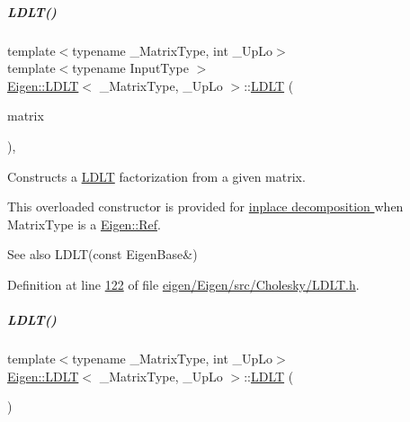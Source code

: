 \mbox{\label{group___cholesky___module_adf853d6cbbc49f3535a44439bca344d9}} 
\subparagraph{\texorpdfstring{L\+D\+L\+T()}{LDLT()}\hspace{0.1cm}{\footnotesize\ttfamily [4/8]}}
{\footnotesize\ttfamily template$<$typename \+\_\+\+Matrix\+Type, int \+\_\+\+Up\+Lo$>$ \\
template$<$typename Input\+Type $>$ \\
\hyperlink{group___cholesky___module_class_eigen_1_1_l_d_l_t}{Eigen\+::\+L\+D\+LT}$<$ \+\_\+\+Matrix\+Type, \+\_\+\+Up\+Lo $>$\+::\hyperlink{group___cholesky___module_class_eigen_1_1_l_d_l_t}{L\+D\+LT} (\begin{DoxyParamCaption}\item[{\hyperlink{group___core___module_struct_eigen_1_1_eigen_base}{Eigen\+Base}$<$ Input\+Type $>$ \&}]{matrix }\end{DoxyParamCaption})\hspace{0.3cm}{\ttfamily [inline]}, {\ttfamily [explicit]}}



Constructs a \hyperlink{group___cholesky___module_class_eigen_1_1_l_d_l_t}{L\+D\+LT} factorization from a given matrix. 

This overloaded constructor is provided for \hyperlink{group___inplace_decomposition}{inplace decomposition } when {\ttfamily Matrix\+Type} is a \hyperlink{group___core___module_class_eigen_1_1_ref}{Eigen\+::\+Ref}.

\begin{DoxySeeAlso}{See also}
L\+D\+L\+T(const Eigen\+Base\&) 
\end{DoxySeeAlso}


Definition at line \hyperlink{eigen_2_eigen_2src_2_cholesky_2_l_d_l_t_8h_source_l00122}{122} of file \hyperlink{eigen_2_eigen_2src_2_cholesky_2_l_d_l_t_8h_source}{eigen/\+Eigen/src/\+Cholesky/\+L\+D\+L\+T.\+h}.

\mbox{\label{group___cholesky___module_a2e06dedd2651649c5b251fbf9ba4e7d4}} 
\subparagraph{\texorpdfstring{L\+D\+L\+T()}{LDLT()}\hspace{0.1cm}{\footnotesize\ttfamily [5/8]}}
{\footnotesize\ttfamily template$<$typename \+\_\+\+Matrix\+Type, int \+\_\+\+Up\+Lo$>$ \\
\hyperlink{group___cholesky___module_class_eigen_1_1_l_d_l_t}{Eigen\+::\+L\+D\+LT}$<$ \+\_\+\+Matrix\+Type, \+\_\+\+Up\+Lo $>$\+::\hyperlink{group___cholesky___module_class_eigen_1_1_l_d_l_t}{L\+D\+LT} (\begin{DoxyParamCaption}{ }\end{DoxyParamCaption})\hspace{0.3cm}{\ttfamily [inline]}}



